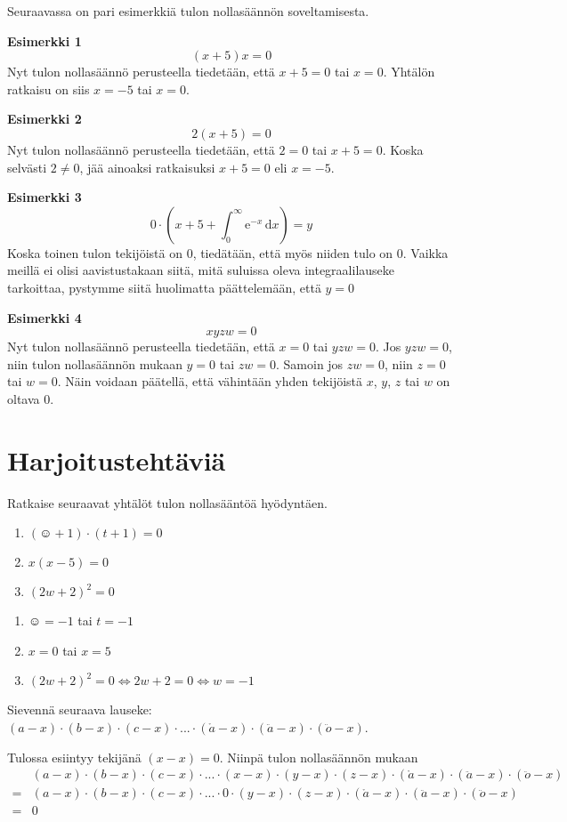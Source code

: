 Seuraavassa on pari esimerkkiä tulon nollasäännön soveltamisesta.

\textbf{Esimerkki 1}
\[(x+5)x=0\]
Nyt tulon nollasäännö perusteella tiedetään, että $x+5=0$ tai $x=0$. Yhtälön ratkaisu on siis $x=-5$ tai $x=0$.

\textbf{Esimerkki 2}
\[2(x+5)=0\]
Nyt tulon nollasäännö perusteella tiedetään, että $2=0$ tai $x+5=0$.
Koska selvästi $2\neq 0$, jää ainoaksi ratkaisuksi $x+5=0$ eli $x=-5$.

\textbf{Esimerkki 3}
\[0\cdot(x+5+\int_0^\infty \mathrm{e}^{-x}\,\mathrm{d}x)=y\]
Koska toinen tulon tekijöistä on $0$, tiedätään, että myös niiden tulo on $0$.
Vaikka meillä ei olisi aavistustakaan siitä, mitä suluissa oleva integraalilauseke tarkoittaa,
pystymme siitä huolimatta päättelemään, että $y=0$

\textbf{Esimerkki 4}
\[xyzw=0\]
Nyt tulon nollasäännö perusteella tiedetään, että $x=0$ tai $yzw=0$. Jos $yzw=0$, niin tulon nollasäännön mukaan
$y=0$ tai $zw=0$. Samoin jos $zw=0$, niin $z=0$ tai $w=0$. Näin voidaan päätellä, että
vähintään yhden tekijöistä $x$, $y$, $z$ tai $w$ on oltava $0$.

\section{Harjoitustehtäviä}
\begin{tehtava}
    Ratkaise seuraavat yhtälöt tulon nollasääntöä hyödyntäen.
    \begin{enumerate}
        \item $(\smiley{}+1)\cdot (t+1)=0$
        \item $x(x-5)=0$
        \item $(2w+2)^2=0$
    \end{enumerate}
    \begin{vastaus}
        \begin{enumerate}
            \item $\smiley{}=-1$ tai $t=-1$
            \item $x=0$ tai $x=5$
            \item $(2w+2)^2=0 \Leftrightarrow 2w+2=0 \Leftrightarrow w=-1$
        \end{enumerate}
    \end{vastaus}
\end{tehtava}

\begin{tehtava}
	Sievennä seuraava lauseke: $(a-x)\cdot(b-x)\cdot(c-x)\cdot...\cdot(\mathring{a}-x)\cdot(\ddot{a}-x)\cdot(\ddot{o}-x)$.
    \begin{vastaus}
		Tulossa esiintyy tekijänä $(x-x)=0$. Niinpä tulon nollasäännön mukaan
		\begin{align*}
 			&(a-x)\cdot(b-x)\cdot(c-x)\cdot...\cdot(x-x)\cdot(y-x)\cdot(z-x)\cdot(\mathring{a}-x)\cdot(\ddot{a}-x)\cdot(\ddot{o}-x) \\
 			=&(a-x)\cdot(b-x)\cdot(c-x)\cdot...\cdot 0\cdot(y-x)\cdot(z-x)\cdot(\mathring{a}-x)\cdot(\ddot{a}-x)\cdot(\ddot{o}-x) \\
 			=&0
		\end{align*}
   \end{vastaus}
\end{tehtava}
